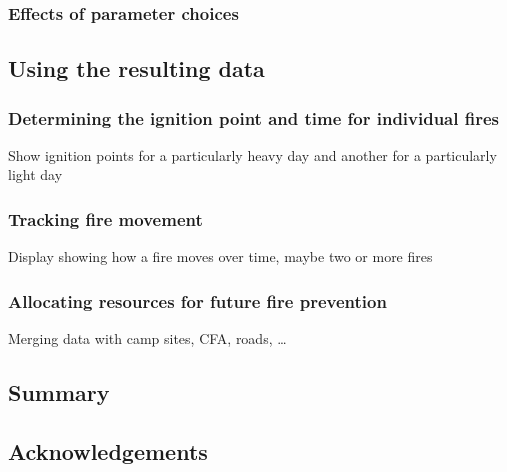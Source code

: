 \hypertarget{effects-of-parameter-choices}{%
\subsubsection{Effects of parameter
choices}\label{effects-of-parameter-choices}}

\hypertarget{using-the-resulting-data}{%
\subsection{Using the resulting data}\label{using-the-resulting-data}}

\hypertarget{determining-the-ignition-point-and-time-for-individual-fires}{%
\subsubsection{Determining the ignition point and time for individual
fires}\label{determining-the-ignition-point-and-time-for-individual-fires}}

Show ignition points for a particularly heavy day and another for a
particularly light day

\hypertarget{tracking-fire-movement}{%
\subsubsection{Tracking fire movement}\label{tracking-fire-movement}}

Display showing how a fire moves over time, maybe two or more fires

\hypertarget{allocating-resources-for-future-fire-prevention}{%
\subsubsection{Allocating resources for future fire
prevention}\label{allocating-resources-for-future-fire-prevention}}

Merging data with camp sites, CFA, roads, \ldots{}

\hypertarget{summary}{%
\subsection{Summary}\label{summary}}

\hypertarget{acknowledgements}{%
\subsection{Acknowledgements}\label{acknowledgements}}

